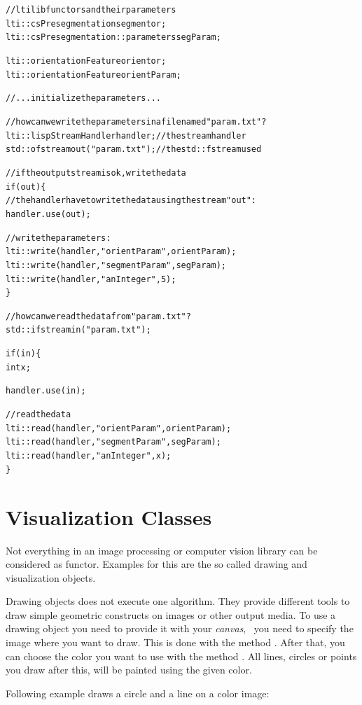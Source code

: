 {\small
\begin{alltt}

  // ltilib functors and their parameters
  lti::csPresegmentation segmentor;
  lti::csPresegmentation::parameters segParam;

  lti::orientationFeature orientor;
  lti::orientationFeature orientParam;

  // ... initialize the parameters ...

  // how can we write the parameters in a file named "param.txt"?
  lti::lispStreamHandler handler;  // the stream handler
  std::ofstream out("param.txt");  // the std::fstream used

  // if the output stream is ok, write the data
  if (out) \{
    // the handler have to write the data using the stream "out":
    handler.use(out);
    
    // write the parameters:
    lti::write(handler,"orientParam",orientParam); 
    lti::write(handler,"segmentParam",segParam);
    lti::write(handler,"anInteger",5);
  \}


  // how can we read the data from "param.txt"?
  std::ifstream in("param.txt");

  if (in) \{
    int x;

    handler.use(in);
    
    // read the data
    lti::read(handler,"orientParam",orientParam); 
    lti::read(handler,"segmentParam",segParam);
    lti::read(handler,"anInteger",x);
  \}
\end{alltt}
}

\section{Visualization Classes}

Not everything in an image processing or computer vision library can be
considered as functor.  Examples for this are the so called drawing and
visualization objects.

Drawing objects does not execute one algorithm.  They provide different tools
to draw simple geometric constructs on images or other output media.  To use a
drawing object you need to provide it with your \emph{canvas}, \ie\ you need to
specify the image where you want to draw.  This is done with the method
.  After that, you can choose the color you want to use with the
method .  All lines, circles or points you draw after this,
will be painted using the given color.

Following example draws a circle and a line on a color image:

